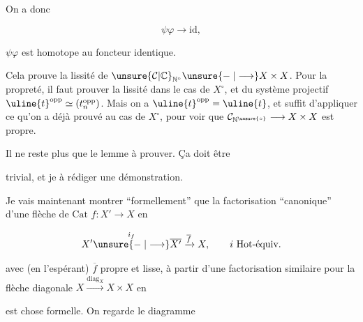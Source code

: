 On a donc

\[
\psi\varphi\longrightarrow\mathrm{id},
\]

$\psi\varphi$ est homotope au foncteur identique.

Cela prouve la lissité de $\unsure{\mathcal C|\mathbb C}_{\mathbb N^\circ}\unsure{\mathrel{-}|\longrightarrow}X\times X$. Pour la propreté, il faut prouver la lissité dans le cas de $X^\circ$, et du système projectif $\uline{t}^{\mathrm{opp}}\simeq(t_n^{\mathrm{opp}})$. Mais on a $\uline{t}^{\mathrm{opp}}=\uline{t}$, et  suffit d'appliquer ce qu'on a déjà prouvé  au cas de $X^\circ$, pour voir que $\mathcal C_{\mathbb N^{\unsure{\circ}}}\longrightarrow X\times X$ est propre.

Il ne reste plus que le lemme à prouver. Ça doit être 

trivial, et je  à rédiger une démonstration.

Je vais maintenant montrer ``formellement'' que la factorisation ``canonique'' d'une flèche de $\mathrm{Cat}$ $f\colon X'\longrightarrow X$ en

\[
X'\overset{i_f}{\unsure{\mathrel{-}|\longrightarrow}}\overline{X'}\xrightarrow{\overline f}X,\qquad i\ \text{Hot-équiv.}
\]

avec (en l'espérant) $\overline f$ propre et lisse, à partir d'une factorisation similaire pour la flèche diagonale $X\xrightarrow{\mathrm{diag}_X}X\times X$ en


est chose formelle. On regarde le diagramme


